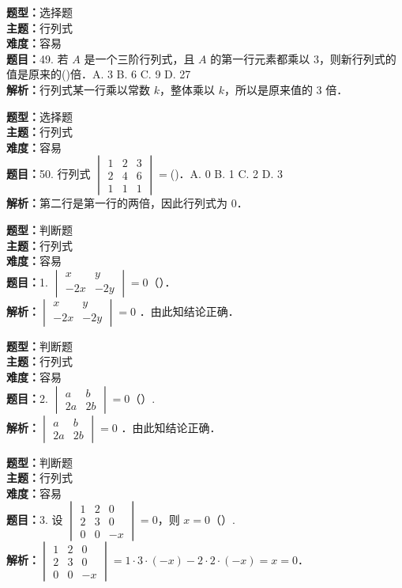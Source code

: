 \documentclass{ctexart}
\newenvironment{question}[5]{%
	\noindent\textbf{题型：}#1\\
	\textbf{主题：}#2\\
	\textbf{难度：}#3\\
	\textbf{题目：}#4\\
	\textbf{解析：}#5\\
	\vspace{1em}
}{}
\begin{document}
	\begin{question}
		{选择题}
		{行列式}
		{容易}
		{49. 若 \(A\) 是一个三阶行列式，且 \(A\) 的第一行元素都乘以 \(3\)，则新行列式的值是原来的(\qquad)倍．A. 3 B. 6 C. 9 D. 27}
		{行列式某一行乘以常数 \(k\)，整体乘以 \(k\)，所以是原来值的 3 倍．}
	\end{question}
	
	\begin{question}
		{选择题}
		{行列式}
		{容易}
		{50. 行列式 \(\begin{vmatrix} 1 & 2 & 3 \\ 2 & 4 & 6 \\ 1 & 1 & 1\end{vmatrix}=\)(\qquad)．A. 0 B. 1 C. 2 D. 3}
		{第二行是第一行的两倍，因此行列式为 0．}
	\end{question}
	
	
	
	
	
	
	
	
	
	
	
	
	
	
	
	
	
	
	
	
	
	\begin{question}
		{判断题}
		{行列式}
		{容易}
		{1. \(\begin{vmatrix} x & y \\ -2 x & -2 y\end{vmatrix}=0\)（）．}
		{\(\begin{vmatrix} x & y \\ -2 x & -2 y\end{vmatrix}=0\) ．由此知结论正确．}
	\end{question}
	
	\begin{question}
		{判断题}
		{行列式}
		{容易}
		{2. \(\begin{vmatrix} a & b \\ 2 a & 2 b\end{vmatrix}=0\)（）. }
		{\(\begin{vmatrix} a & b \\ 2 a & 2 b\end{vmatrix}=0\) ．由此知结论正确．}
	\end{question}
	
	\begin{question}
		{判断题}
		{行列式}
		{容易}
		{3. 设 \(\begin{vmatrix} 1 & 2 & 0 \\ 2 & 3 & 0 \\ 0 & 0 & -x\end{vmatrix}=0\)，则 \(x=0\)（）. }
		{\(\begin{vmatrix} 1 & 2 & 0 \\ 2 & 3 & 0 \\ 0 & 0 & -x\end{vmatrix}=1 \cdot 3 \cdot(-x) - 2 \cdot 2 \cdot(-x)=x=0\)．}
	\end{question}
	
\end{document}
